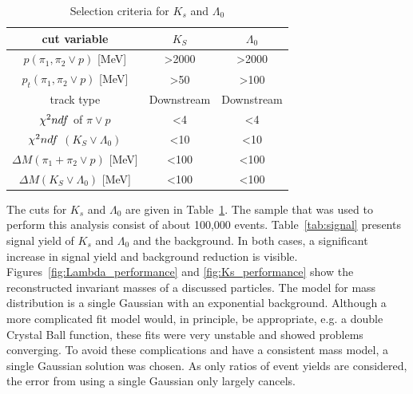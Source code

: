  
\begin{table}[h]
\centering
\caption{Selection criteria for $K_s$ and $\Lambda_0$ }
\begin{tabular}{|c|c|c|}
\hline
cut variable                                  & $K_S$              & $\Lambda_0$        \\ \hline
$p(\pi_1, \pi_2 \lor p)$ {[}MeV{]}              & \textgreater{}2000 & \textgreater{}2000 \\ \hline
$p_t(\pi_1, \pi_2 \lor p)$ {[}MeV{]}            & \textgreater{}50   & \textgreater{}100  \\ \hline
track type                               & Downstream         & Downstream         \\ \hline
$\chi^2\/ndf$ of $\pi \lor p$              & \textless{}4       & \textless{}4       \\ \hline
$\chi^2\/ndf$ $(K_S \lor \Lambda_0)$       & \textless{}10      & \textless{}10      \\ \hline
$\Delta M(\pi_1 + \pi_2 \lor p)$ {[}MeV{]} & \textless{}100     & \textless{}100     \\ \hline
$\Delta M(K_S \lor \Lambda_0)$ {[}MeV{]}   & \textless{}100     & \textless{}100     \\ \hline
\end{tabular}
\label{tab:cuts}
\end{table}
 
 
 The cuts for $K_s$ and $\Lambda_0$ are given in Table~\ref{tab:cuts}. The sample that was used to perform this analysis consist of about 100,000 events. Table~\ref{tab:signal} presents signal yield of $K_s$ and $\Lambda_0$ and the background. In both cases, a significant increase in signal yield and background reduction is visible. Figures~\ref{fig:Lambda_performance} and \ref{fig:Ks_performance} show the reconstructed invariant masses of a discussed particles. The model for mass distribution is a single Gaussian with an exponential background. Although a more complicated fit model would, in principle, be appropriate, e.g. a double Crystal Ball function, these fits were very unstable and showed problems converging. To avoid these complications and have a consistent mass model, a single Gaussian solution was chosen. As only ratios of event yields are considered, the error from using a single Gaussian only largely cancels. 
 

